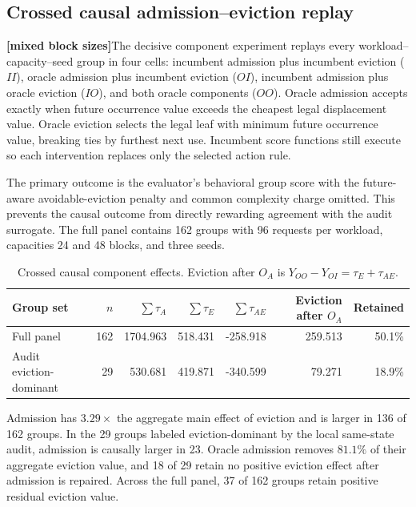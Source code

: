 \documentclass[11pt]{article}
\newcommand{\mixedblocktag}{\textbf{\color{navy}[mixed block sizes]}}
\begin{document}
\subsection{Crossed causal admission--eviction replay}

\mixedblocktag The decisive component experiment replays every
workload--capacity--seed group in four cells: incumbent admission plus incumbent
eviction (\(II\)), oracle admission plus incumbent eviction (\(OI\)), incumbent
admission plus oracle eviction (\(IO\)), and both oracle components (\(OO\)).  Oracle
admission accepts exactly when future occurrence value exceeds the cheapest legal
displacement value.  Oracle eviction selects the legal leaf with minimum future
occurrence value, breaking ties by furthest next use.  Incumbent score functions still
execute so each intervention replaces only the selected action rule.

The primary outcome is the evaluator's behavioral group score with the future-aware
avoidable-eviction penalty and common complexity charge omitted.  This prevents the
causal outcome from directly rewarding agreement with the audit surrogate.  The full
panel contains 162 groups with 96 requests per workload, capacities 24 and 48 blocks,
and three seeds.

\begin{table}[H]
\centering
\small
\begin{tabular}{lrrrrrr}
\toprule
Group set & \(n\) & \(\sum\tau_A\) & \(\sum\tau_E\) &
\(\sum\tau_{AE}\) & Eviction after \(O_A\) & Retained \\
\midrule
Full panel & 162 & 1704.963 & 518.431 & -258.918 & 259.513 & 50.1\% \\
Audit eviction-dominant & 29 & 530.681 & 419.871 & -340.599 & 79.271 & 18.9\% \\
\bottomrule
\end{tabular}
\caption{Crossed causal component effects.  Eviction after \(O_A\) is
\(Y_{OO}-Y_{OI}=\tau_E+\tau_{AE}\).}
\label{tab:research-causal-components}
\end{table}

Admission has \(3.29\times\) the aggregate main effect of eviction and is larger in
136 of 162 groups.  In the 29 groups labeled eviction-dominant by the local same-state
audit, admission is causally larger in 23.  Oracle admission removes \(81.1\%\) of
their aggregate eviction value, and 18 of 29 retain no positive eviction effect after
admission is repaired.  Across the full panel, 37 of 162 groups retain positive
residual eviction value.
\end{document}
